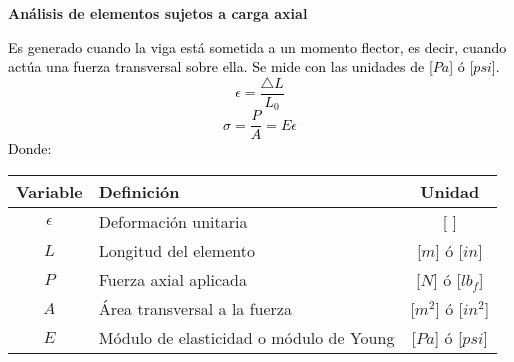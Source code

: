 \documentclass[letterpaper,11pt]{extarticle}
\newcommand{\mybox}[2]
{
    \begin{tcolorbox}[colback=color!5!white,colframe=color!75!black,boxsep=1pt,arc=0pt,outer arc=0pt,title={\textcolor{white}{#1}}]
        \textcolor{black}{#2}
    \end{tcolorbox}
}
\begin{document}
    \renewcommand{\arraystretch}{1.5} %
    \fontsize{10pt}{11pt}\selectfont
    
    \begin{center} 
        \textbf{Análisis de elementos sujetos a carga axial}
    \end{center}

    \begin{multicols}{2}
        \mybox{Esfuerzo normal:}
        {
            Es generado cuando la viga está sometida a un momento flector, es decir, cuando actúa una fuerza transversal sobre ella. Se mide con las unidades de [$Pa$] ó [$psi$].
            \begin{equation}
                \epsilon = \frac{\triangle L}{L_0}
            \end{equation}
            \begin{equation}
                \sigma = \frac{P}{A} = E\epsilon
            \end{equation}
            Donde:
            \begin{center}
                \begin{tabular}{ c | p{35mm} | c }
                    \hline Variable & Definición & Unidad \\ \hline 
                    $\epsilon$ & Deformación unitaria & [ ]\\
                    $L$ & Longitud del elemento & [$m$] ó [$in$]\\
                    $P$ & Fuerza axial aplicada & [$N$] ó [$lb_f$]\\
                    $A$ & Área transversal a la fuerza & [$m^2$] ó [$in^2$]\\
                    $E$ & Módulo de elasticidad o módulo de Young & [$Pa$] ó [$psi$]\\ \hline
                \end{tabular}
            \end{center}
        }


\end{multicols}
\end{document}
